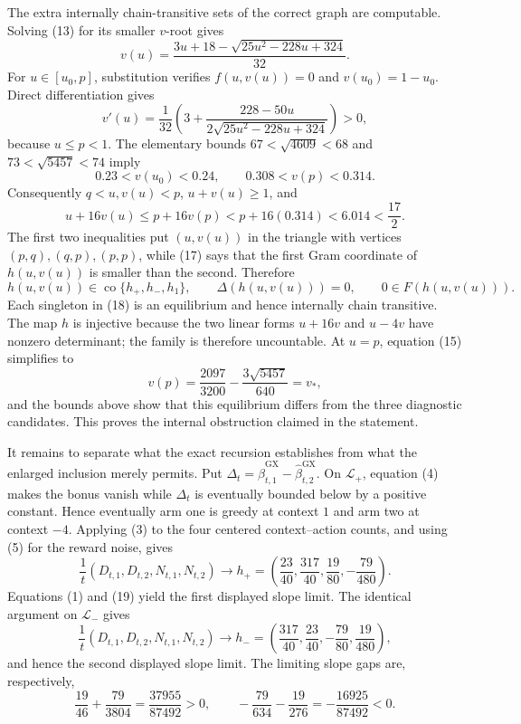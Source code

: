 The extra internally chain-transitive sets of the correct graph are computable. Solving (13) for its smaller \(v\)-root gives
\[
 v(u)=\frac{3u+18-\sqrt{25u^2-228u+324}}{32}. \tag{15}
\]
For \(u\in[u_0,p]\), substitution verifies \(f(u,v(u))=0\) and \(v(u_0)=1-u_0\). Direct differentiation gives
\[
 v'(u)=\frac1{32}\left(3+\frac{228-50u}{2\sqrt{25u^2-228u+324}}\right)>0, \tag{16}
\]
because \(u\leq p<1\). The elementary bounds \(67<\sqrt{4609}<68\) and \(73<\sqrt{5457}<74\) imply
\[
 0.23<v(u_0)<0.24,\qquad 0.308<v(p)<0.314.
\]
Consequently \(q<u,v(u)<p\), \(u+v(u)\geq1\), and
\[
 u+16v(u)\leq p+16v(p)<p+16(0.314)<6.014<\frac{17}{2}. \tag{17}
\]
The first two inequalities put \((u,v(u))\) in the triangle with vertices \((p,q),(q,p),(p,p)\), while (17) says that the first Gram coordinate of \(h(u,v(u))\) is smaller than the second. Therefore
\[
 h(u,v(u))\in\operatorname{co}\{h_+,h_-,h_1\},\qquad
 \Delta(h(u,v(u)))=0,\qquad 0\in F(h(u,v(u))). \tag{18}
\]
Each singleton in (18) is an equilibrium and hence internally chain transitive. The map \(h\) is injective because the two linear forms \(u+16v\) and \(u-4v\) have nonzero determinant; the family is therefore uncountable. At \(u=p\), equation (15) simplifies to
\[
 v(p)=\frac{2097}{3200}-\frac{3\sqrt{5457}}{640}=v_*,
\]
and the bounds above show that this equilibrium differs from the three diagnostic candidates. This proves the internal obstruction claimed in the statement.

It remains to separate what the exact recursion establishes from what the enlarged inclusion merely permits. Put \(\Delta_t=\widehat\beta^{\mathrm{GX}}_{t,1}-\widehat\beta^{\mathrm{GX}}_{t,2}\). On \(\mathcal L_+\), equation (4) makes the bonus vanish while \(\Delta_t\) is eventually bounded below by a positive constant. Hence eventually arm one is greedy at context \(1\) and arm two at context \(-4\). Applying (3) to the four centered context--action counts, and using (5) for the reward noise, gives
\[
 \frac1t(D_{t,1},D_{t,2},N_{t,1},N_{t,2})
 \longrightarrow h_+=\left(\frac{23}{40},\frac{317}{40},\frac{19}{80},-\frac{79}{480}\right). \tag{19}
\]
Equations (1) and (19) yield the first displayed slope limit. The identical argument on \(\mathcal L_-\) gives
\[
 \frac1t(D_{t,1},D_{t,2},N_{t,1},N_{t,2})
 \longrightarrow h_-=\left(\frac{317}{40},\frac{23}{40},-\frac{79}{80},\frac{19}{480}\right), \tag{20}
\]
and hence the second displayed slope limit. The limiting slope gaps are, respectively,
\[
 \frac{19}{46}+\frac{79}{3804}=
 \frac{37955}{87492}>0,
 \qquad
 -\frac{79}{634}-\frac{19}{276}=-\frac{16925}{87492}<0. \tag{21}
\]

